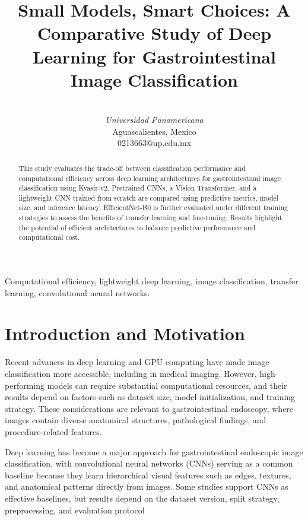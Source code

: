 \documentclass[conference]{IEEEtran}
\begin{document}
\title{Small Models, Smart Choices: A Comparative Study of Deep Learning for Gastrointestinal Image Classification\\
}

\author{
 \\
\textit{Universidad Panamericana}\\
Aguascalientes, Mexico \\
0213663@up.edu.mx}


\maketitle

\begin{abstract}
This study evaluates the trade-off between classification performance and computational efficiency across deep learning architectures for gastrointestinal image classification using Kvasir-v2. Pretrained CNNs, a Vision Transformer, and a lightweight CNN trained from scratch are compared using predictive metrics, model size, and inference latency. EfficientNet-B0 is further evaluated under different training strategies to assess the benefits of transfer learning and fine-tuning. Results highlight the potential of efficient architectures to balance predictive performance and computational cost.
\end{abstract}

\begin{IEEEkeywords}
Computational efficiency, lightweight deep learning, image classification, transfer learning, convolutional neural networks.
\end{IEEEkeywords}

\section{Introduction and Motivation}
Recent advances in deep learning and GPU computing have made image classification more accessible, including in medical imaging. However, high-performing models can require substantial computational resources, and their results depend on factors such as dataset size, model initialization, and training strategy. These considerations are relevant to gastrointestinal endoscopy, where images contain diverse anatomical structures, pathological findings, and procedure-related features.

Deep learning has become a major approach for gastrointestinal endoscopic image classification, with convolutional neural networks (CNNs) serving as a common baseline because they learn hierarchical visual features such as edges, textures, and anatomical patterns directly from images. Some studies support CNNs as effective baselines, but results depend on the dataset version, split strategy, preprocessing, and evaluation protocol
\end{document}

